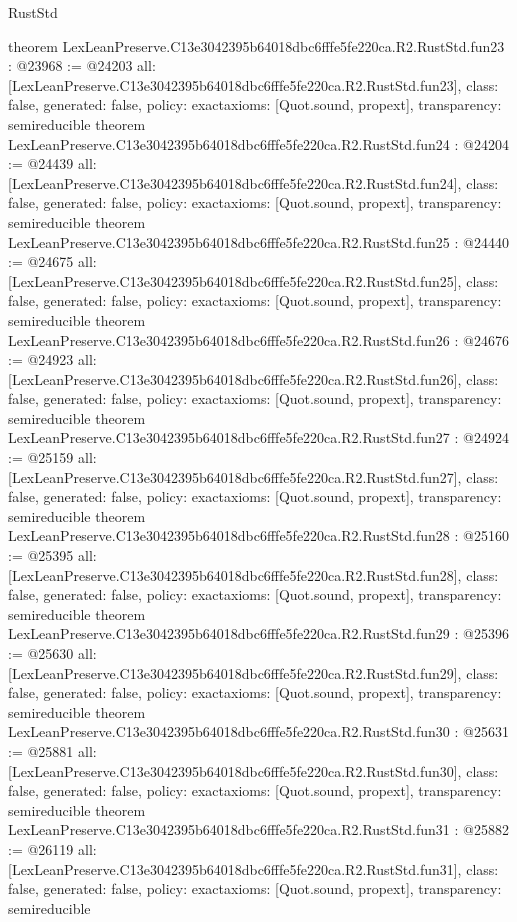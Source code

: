 \begin{lexlean}{RustStd}
\begin{coremodule}
{}
theorem LexLeanPreserve.C13e3042395b64018dbc6fffe5fe220ca.R2.RustStd.fun23 : @23968 := @24203 {
  all: [LexLeanPreserve.C13e3042395b64018dbc6fffe5fe220ca.R2.RustStd.fun23],
  class: false,
  generated: false,
  policy: exact{axioms: [Quot.sound, propext]},
  transparency: semireducible
}
theorem LexLeanPreserve.C13e3042395b64018dbc6fffe5fe220ca.R2.RustStd.fun24 : @24204 := @24439 {
  all: [LexLeanPreserve.C13e3042395b64018dbc6fffe5fe220ca.R2.RustStd.fun24],
  class: false,
  generated: false,
  policy: exact{axioms: [Quot.sound, propext]},
  transparency: semireducible
}
theorem LexLeanPreserve.C13e3042395b64018dbc6fffe5fe220ca.R2.RustStd.fun25 : @24440 := @24675 {
  all: [LexLeanPreserve.C13e3042395b64018dbc6fffe5fe220ca.R2.RustStd.fun25],
  class: false,
  generated: false,
  policy: exact{axioms: [Quot.sound, propext]},
  transparency: semireducible
}
theorem LexLeanPreserve.C13e3042395b64018dbc6fffe5fe220ca.R2.RustStd.fun26 : @24676 := @24923 {
  all: [LexLeanPreserve.C13e3042395b64018dbc6fffe5fe220ca.R2.RustStd.fun26],
  class: false,
  generated: false,
  policy: exact{axioms: [Quot.sound, propext]},
  transparency: semireducible
}
theorem LexLeanPreserve.C13e3042395b64018dbc6fffe5fe220ca.R2.RustStd.fun27 : @24924 := @25159 {
  all: [LexLeanPreserve.C13e3042395b64018dbc6fffe5fe220ca.R2.RustStd.fun27],
  class: false,
  generated: false,
  policy: exact{axioms: [Quot.sound, propext]},
  transparency: semireducible
}
theorem LexLeanPreserve.C13e3042395b64018dbc6fffe5fe220ca.R2.RustStd.fun28 : @25160 := @25395 {
  all: [LexLeanPreserve.C13e3042395b64018dbc6fffe5fe220ca.R2.RustStd.fun28],
  class: false,
  generated: false,
  policy: exact{axioms: [Quot.sound, propext]},
  transparency: semireducible
}
theorem LexLeanPreserve.C13e3042395b64018dbc6fffe5fe220ca.R2.RustStd.fun29 : @25396 := @25630 {
  all: [LexLeanPreserve.C13e3042395b64018dbc6fffe5fe220ca.R2.RustStd.fun29],
  class: false,
  generated: false,
  policy: exact{axioms: [Quot.sound, propext]},
  transparency: semireducible
}
theorem LexLeanPreserve.C13e3042395b64018dbc6fffe5fe220ca.R2.RustStd.fun30 : @25631 := @25881 {
  all: [LexLeanPreserve.C13e3042395b64018dbc6fffe5fe220ca.R2.RustStd.fun30],
  class: false,
  generated: false,
  policy: exact{axioms: [Quot.sound, propext]},
  transparency: semireducible
}
theorem LexLeanPreserve.C13e3042395b64018dbc6fffe5fe220ca.R2.RustStd.fun31 : @25882 := @26119 {
  all: [LexLeanPreserve.C13e3042395b64018dbc6fffe5fe220ca.R2.RustStd.fun31],
  class: false,
  generated: false,
  policy: exact{axioms: [Quot.sound, propext]},
  transparency: semireducible
}
\end{coremodule}
\end{lexlean}
